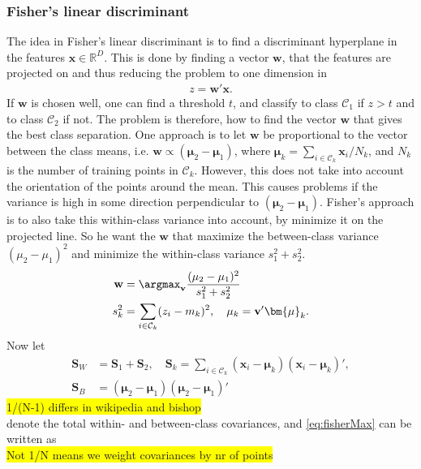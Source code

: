 \subsubsection{Fisher's linear discriminant}
\label{sub:Fisher's linear discriminant}
The idea in Fisher's linear discriminant is to find a discriminant hyperplane in the features $\mathbf{x}\in \mathbb{R}^D$. This is done by finding a vector $\mathbf{w}$, that the features are projected on and thus reducing the problem to one dimension in 
\begin{align}
  z = \mathbf{w}'\mathbf{x}.
\end{align}
If $\mathbf{w}$ is chosen well, one can find a threshold $t$, and classify to class $\mathcal{C}_1$ if $z > t$ and to class $\mathcal{C}_2$ if not. The problem is therefore, how to find the vector $\mathbf{w}$ that gives the best class separation. One approach is to let $\mathbf{w}$ be proportional to the vector between the class means, i.e. $\mathbf{w} \propto (\bm{\mu}_2 - \bm{\mu}_1)$, where $\bm{\mu}_k = \sum_{i \in \mathcal{C}_k} \mathbf{x}_i/N_k$, and $N_k$ is the number of training points in $\mathcal{C}_k$. However, this does not take into account the orientation of the points around the mean. This causes problems if the variance is high in some direction perpendicular to $(\bm{\mu}_2 - \bm{\mu}_1)$. Fisher's approach is to also take this within-class variance into account, by minimize it on the projected line. So he want the $\mathbf{w}$ that maximize the between-class variance $(\mu_2 - \mu_1)^2$ and minimize the within-class variance $s_1^2 + s_2^2$. 
\begin{align}
  \label{eq:fisherMax} 
  \mathbf{w} &= \argmax_{\mathbf{v}} \frac{(\mu_2 - \mu_1)^2}{s_1^2 + s_2^2} \\
  s_k^2 &= \sum_{i \in \mathcal{C}_k} (z_i - m_k)^2, \quad \mu_k = \mathbf{v}'\bm{\mu}_k.
\end{align}
Now let 
\begin{align}
  \mathbf{S}_W &= \mathbf{S}_1 + \mathbf{S}_2, \quad  \mathbf{S}_k =  \sum_{i \in \mathcal{C}_k} (\mathbf{x}_i - \bm{\mu}_k)(\mathbf{x}_i - \bm{\mu}_k)', \\
  \label{eq:SB} 
  \mathbf{S}_B &= (\bm{\mu}_2 - \bm{\mu}_1)(\bm{\mu}_2 - \bm{\mu}_1)'
\end{align}
\colorbox{yellow}{1/(N-1) differs in wikipedia and bishop}\\
denote the total within- and between-class covariances, and \eqref{eq:fisherMax} can be written as
\\ \colorbox{yellow}{Not 1/N means we weight covariances by nr of points}\\
